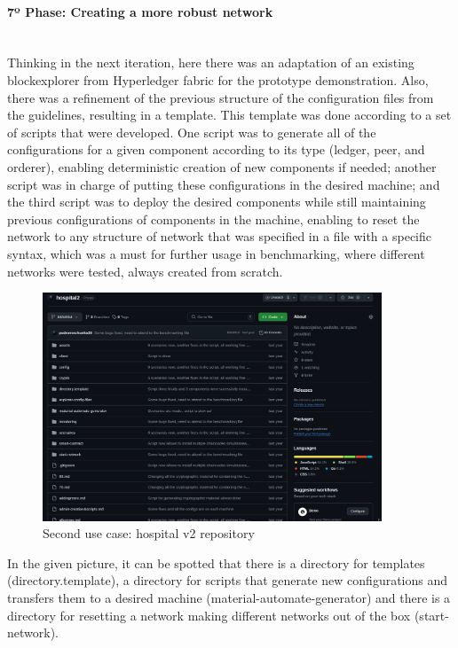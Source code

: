 \paragraph{7º Phase: Creating a more robust network}\mbox{}\\
Thinking in the next iteration, here there was an adaptation of an existing blockexplorer from Hyperledger fabric for the prototype demonstration. Also, there was a refinement of the previous structure of the configuration files from the guidelines, resulting in a template. This template was done according to a set of scripts that were developed. One script was to generate all of the configurations for a given component according to its type (ledger, peer, and orderer), enabling deterministic creation of new components if needed; another script was in charge of putting these configurations in the desired machine; and the third script was to deploy the desired components while still maintaining previous configurations of components in the machine, enabling to reset the network to any structure of network that was specified in a file with a specific syntax, which was a must for further usage in benchmarking, where different networks were tested, always created from scratch.
\begin{figure}[H]
    \centering
    \includegraphics[width=0.9\textwidth]{assets/use-case-2/robust-network-creation.png} %
    \caption{Second use case: hospital v2 repository}
    \label{fig:sample-image} 
\end{figure}
In the given picture, it can be spotted that there is a directory for templates (directory.template), a directory for scripts that generate new configurations  and transfers them to a desired machine (material-automate-generator) and there is a directory for resetting a network making different networks out of the box (start-network).

